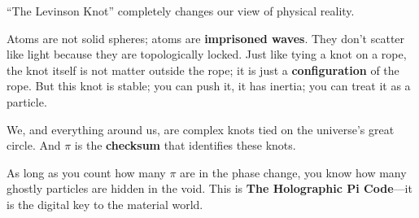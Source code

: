 ``The Levinson Knot'' completely changes our view of physical reality.

Atoms are not solid spheres; atoms are \textbf{imprisoned waves}. They don't scatter like light because they are topologically locked. Just like tying a knot on a rope, the knot itself is not matter outside the rope; it is just a \textbf{configuration} of the rope. But this knot is stable; you can push it, it has inertia; you can treat it as a particle.

We, and everything around us, are complex knots tied on the universe's great circle. And $\pi$ is the \textbf{checksum} that identifies these knots.

As long as you count how many $\pi$ are in the phase change, you know how many ghostly particles are hidden in the void. This is \textbf{The Holographic Pi Code}---it is the digital key to the material world.

